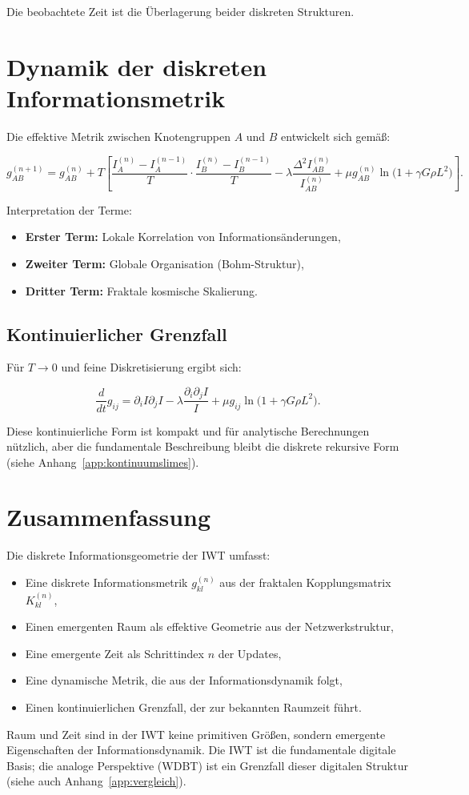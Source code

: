 Die beobachtete Zeit ist die Überlagerung beider diskreten Strukturen.

\section{Dynamik der diskreten Informationsmetrik}
\label{sec:metrik_dynamik}

Die effektive Metrik zwischen Knotengruppen \( A \) und \( B \) entwickelt sich gemäß:

\[
g_{AB}^{(n+1)} = g_{AB}^{(n)} + T \left[ \frac{I_A^{(n)} - I_A^{(n-1)}}{T} \cdot \frac{I_B^{(n)} - I_B^{(n-1)}}{T} - \lambda \frac{\Delta^2 I_{AB}^{(n)}}{I_{AB}^{(n)}} + \mu g_{AB}^{(n)} \ln\!\bigl(1 + \gamma G \rho L^2\bigr) \right].
\]

Interpretation der Terme:

\begin{itemize}
    \item \textbf{Erster Term:} Lokale Korrelation von Informationsänderungen,
    \item \textbf{Zweiter Term:} Globale Organisation (Bohm-Struktur),
    \item \textbf{Dritter Term:} Fraktale kosmische Skalierung.
\end{itemize}

\subsection{Kontinuierlicher Grenzfall}
\label{sub:metrik_kontinuierlicher_grenzfall}

Für \( T \to 0 \) und feine Diskretisierung ergibt sich:

\[
\frac{d}{dt} g_{ij} = \partial_i I \partial_j I - \lambda \frac{\partial_i \partial_j I}{I} + \mu g_{ij} \ln\!\bigl(1 + \gamma G \rho L^2\bigr).
\]

Diese kontinuierliche Form ist kompakt und für analytische Berechnungen nützlich, aber die fundamentale Beschreibung bleibt die diskrete rekursive Form (siehe Anhang~\ref{app:kontinuumslimes}).

\section{Zusammenfassung}
\label{sec:emergenz_zusammenfassung}

Die diskrete Informationsgeometrie der IWT umfasst:

\begin{itemize}
    \item Eine diskrete Informationsmetrik \( g_{kl}^{(n)} \) aus der fraktalen Kopplungsmatrix \( K_{kl}^{(n)} \),
    \item Einen emergenten Raum als effektive Geometrie aus der Netzwerkstruktur,
    \item Eine emergente Zeit als Schrittindex \( n \) der Updates,
    \item Eine dynamische Metrik, die aus der Informationsdynamik folgt,
    \item Einen kontinuierlichen Grenzfall, der zur bekannten Raumzeit führt.
\end{itemize}

Raum und Zeit sind in der IWT keine primitiven Größen, sondern emergente Eigenschaften der Informationsdynamik. Die IWT ist die fundamentale digitale Basis; die analoge Perspektive (WDBT) ist ein Grenzfall dieser digitalen Struktur (siehe auch Anhang~\ref{app:vergleich}).